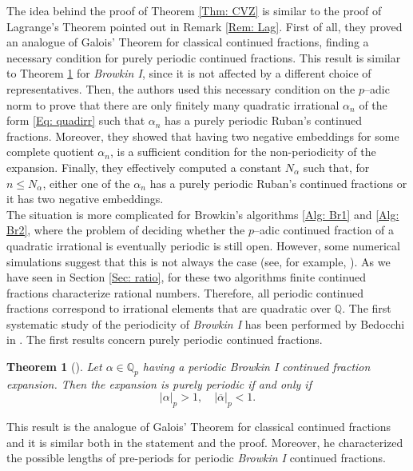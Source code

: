 \documentclass[12pt, reqno]{amsart}
\theoremstyle{plain}
\newtheorem{Theorem}{Theorem}
\theoremstyle{definition}
\begin{document}
The idea behind the proof of Theorem \ref{Thm: CVZ} is similar to the proof of Lagrange's Theorem pointed out in Remark \ref{Rem: Lag}. First of all, they proved an analogue of Galois' Theorem for classical continued fractions, finding a necessary condition for purely periodic continued fractions. This result is similar to Theorem \ref{Thm: PurePerBr1} for \textit{Browkin I}, since it is not affected by a different choice of representatives. Then, the authors used this necessary condition on the $p$--adic norm to prove that there are only finitely many quadratic irrational $\alpha_n$ of the form \eqref{Eq: quadirr} such that $\alpha_n$ has a purely periodic Ruban's continued fractions. Moreover, they showed that having two negative embeddings for some complete quotient $\alpha_n$, is a sufficient condition for the non-periodicity of the expansion. Finally, they  effectively computed a constant $N_{\alpha}$ such that, for $n\leq N_{\alpha}$, either one of the $\alpha_n$ has a purely periodic Ruban's continued fractions or it has two negative embeddings.\\

The situation is more complicated for Browkin's algorithms \eqref{Alg: Br1} and \eqref{Alg: Br2}, where the problem of deciding whether the $p$--adic continued fraction of a quadratic irrational is eventually periodic is still open. However, some numerical simulations suggest that this is not always the case (see, for example, \cite{BCMI,BCMII,BI, BII,CMT,MR}). As we have seen in Section \ref{Sec: ratio}, for these two algorithms finite continued fractions characterize rational numbers. Therefore, all periodic continued fractions correspond to irrational elements that are quadratic over $\mathbb{Q}$. The first systematic study of the periodicity of \textit{Browkin I} has been performed by Bedocchi in \cite{BEI, BEII, BEIII, BEIV}. The first results concern purely periodic continued fractions.

\begin{Theorem}[\cite{BEI}]\label{Thm: PurePerBr1}
Let $\alpha\in\mathbb{Q}_p$ having a periodic \textit{Browkin I} continued fraction expansion. Then the expansion is purely periodic if and only if
\[|\alpha|_p> 1, \quad |\overline{\alpha}|_p<1.\]
\end{Theorem}

This result is the analogue of Galois' Theorem for classical continued fractions and it is similar both in the statement and the proof. Moreover, he characterized the possible lengths of pre-periods for periodic \textit{Browkin I} continued fractions.
\end{document}
